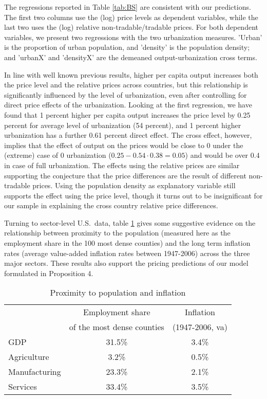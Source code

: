 \documentclass[12pt]{article}
\begin{document}
The regressions reported in Table \ref{tab:BS} are consistent with our predictions. The first two columns use the (log) price levels as
dependent variables, while the last two uses the (log) relative
non-tradable/tradable prices. For both dependent variables, we
present two regressions with the two urbanization measures. 'Urban'
is the proportion of urban population, and 'density' is the
population density; and 'urbanX' and 'densityX' are the demeaned
output-urbanization cross terms.

In line with well known previous results, higher per capita output
increases both the price level and the relative prices across
countries, but this relationship is significantly influenced by the
level of urbanization, even after controlling for direct price
effects of the urbanization. Looking at the first regression, we
have found that 1 percent higher per capita output increases the price
level by 0.25 percent for average level of urbanization (54 percent), and 1 percent higher urbanization has a further 0.61 percent direct effect. The cross effect, however, implies that the effect of output on the prices would be close to 0 under the (extreme) case of 0 urbanization
($0.25-0.54\cdot0.38=0.05$) and would be over 0.4 in case of full
urbanization. The effects using the relative prices are similar
supporting the conjecture that the price differences are the result
of different non-tradable prices. Using the population density as
explanatory variable still supports the effect using the price
level, though it turns out to be insignificant for our sample in
explaining the cross country relative price differences.

Turning to sector-level U.S.~data, table \ref{tab:infl} gives some suggestive evidence on the relationship between proximity to the population (measured here as the employment share in the 100 most dense counties) and the long term inflation rates (average value-added inflation rates between 1947-2006) across the three major sectors. These results also support the pricing predictions of our model formulated in Proposition 4.

\begin{table}[h!]
\center
\caption{Proximity to population and inflation} \label{tab:infl}
\begin{tabular}{l|cc}
\hline\hline
& Employment share & Inflation \\
& of the most dense counties & (1947-2006, va)\\ \hline
GDP & 31.5\% & 3.4\% \\ \hline
Agriculture & 3.2\% & 0.5\% \\
Manufacturing & 23.3\% & 2.1\% \\
Services & 33.4\% & 3.5\% \\ \hline\hline
\end{tabular}
\end{table}
\end{document}
